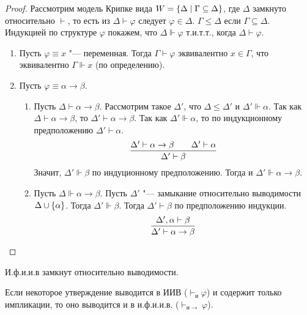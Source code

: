 \begin{proof}
    Рассмотрим модель Крипке вида $W = \left\{\Delta \mid \Gamma \subseteq \Delta\right\}$, где $\Delta$ замкнуто относительно $\vdash$,
    то есть из $\Delta \vdash \varphi$ следует $\varphi \in \Delta$.
    $\Gamma \leq \Delta$ если $\Gamma \subseteq \Delta$.
    Индукцией по структуре $\varphi$ покажем, что $\Delta \Vdash \varphi$ т.и.т.т., когда $\Delta \vdash \varphi$.
    \begin{enumerate}
        \item Пусть $\varphi \equiv x$ "--- переменная. Тогда $\Gamma \vdash \varphi$ эквивалентно $x \in \Gamma$, что эквивалентно $\Gamma\Vdash x$ (по определению).
        \item Пусть $\varphi \equiv \alpha \to \beta$.
        \begin{enumerate}[label=(\asbuk*)]
            \item Пусть $\Delta \vdash \alpha\to\beta$.
                Рассмотрим такое $\Delta'$, что $\Delta \leq \Delta'$ и $\Delta' \Vdash \alpha$.
                Так как $\Delta \vdash \alpha\to\beta$, то $\Delta' \vdash \alpha\to\beta$.
                Так как $\Delta' \Vdash \alpha$, то по индукционному предположению $\Delta' \vdash \alpha$.
                \[
                    \infer{\Delta' \vdash \beta}{\Delta' \vdash \alpha \to \beta && \Delta' \vdash \alpha}
                \]
                Значит, $\Delta' \Vdash \beta$ по индуционному предположению. Тогда и $\Delta' \Vdash \alpha\to\beta$.
            \item Пусть $\Delta \Vdash \alpha\to\beta$.
                Пусть $\Delta'$ "--- замыкание относительно выводимости $\Delta \cup \left\{\alpha\right\}$.
                Тогда $\Delta' \Vdash \beta$. Тогда $\Delta' \vdash \beta$ по предположению индукции.
                \[
                    \infer{\Delta' \vdash \alpha \to \beta}{\Delta', \alpha \vdash \beta}
                    \qedhere
                \]
        \end{enumerate}
    \end{enumerate}
\end{proof}

\begin{corollary}
    И.ф.и.и.в замкнут относительно выводимости.
\end{corollary}
Если некоторое утверждение выводится в ИИВ ($\vdash_{и} \varphi$) и содержит только импликации,
то оно выводится и в и.ф.и.и.в. ($\vdash_{и \to} \varphi$).
